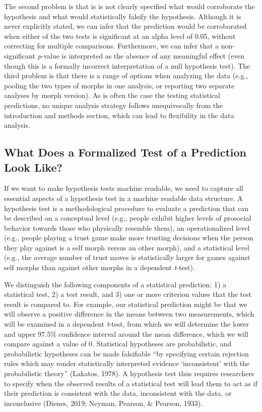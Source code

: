 \documentclass[english,doc,floatsintext]{apa6}
\begin{document}
The second problem is that is is not clearly specified what would corroborate the hypothesis and what would statistically falsify the hypothesis. Although it is never explicitly stated, we can infer that the prediction would be corroborated when either of the two tests is significant at an alpha level of 0.05, without correcting for multiple comparisons. Furthermore, we can infer that a non-significant \emph{p}-value is interpreted as the absence of any meaningful effect (even though this is a formally incorrect interpretation of a null hypothesis test). The third problem is that there is a range of options when analyzing the data (e.g., pooling the two types of morphs in one analysis, or reporting two separate analyses by morph version). As is often the case the testing statistical predictions, no unique analysis strategy follows unequivocally from the introduction and methods section, which can lead to flexibility in the data analysis.

\hypertarget{what-does-a-formalized-test-of-a-prediction-look-like}{%
\subsection{What Does a Formalized Test of a Prediction Look Like?}\label{what-does-a-formalized-test-of-a-prediction-look-like}}

If we want to make hypothesis tests machine readable, we need to capture all essential aspects of a hypothesis test in a machine readable data structure. A hypothesis test is a methodological procedure to evaluate a prediction that can be described on a conceptual level (e.g., people exhibit higher levels of prosocial behavior towards those who physically resemble them), an operationalized level (e.g., people playing a trust game make more trusting decisions when the person they play against is a self morph versus an other morph), and a statistical level (e.g., the average number of trust moves is statistically larger for games against self morphs than against other morphs in a dependent \emph{t}-test).

We distinguish the following components of a statistical prediction: 1) a statistical test, 2) a test result, and 3) one or more criterion values that the test result is compared to. For example, our statistical prediction might be that we will observe a positive difference in the means between two measurements, which will be examined in a dependent \emph{t}-test, from which we will determine the lower and upper 97.5\% confidence interval around the mean difference, which we will compare against a value of 0. Statistical hypotheses are probabilistic, and probabilistic hypotheses can be made falsifiable \enquote{by specifying certain rejection rules which may render statistically interpreted evidence \enquote{inconsistent} with the probabilistic theory} (Lakatos, 1978). A hypothesis test thus requires researchers to specify when the observed results of a statistical test will lead them to act as if their prediction is consistent with the data, inconsistent with the data, or inconclusive (Dienes, 2019; Neyman, Pearson, \& Pearson, 1933).
\end{document}
